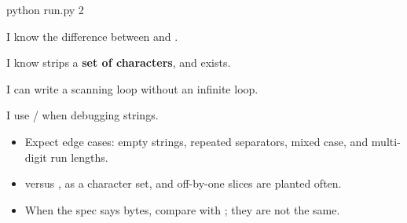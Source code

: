 \documentclass[10pt,a4paper]{article}
\begin{document}
\begin{shcode}
python run.py 2
\end{shcode}
\begin{checklistbox}
\begin{checklist}
\item I know the difference between  and .
\item I know  strips a \textbf{set of characters}, and  exists.
\item I can write a  scanning loop without an infinite loop.
\item I use  /  when debugging strings.
\end{checklist}
\scoreline
\end{checklistbox}
\begin{examlensbox}
\begin{itemize}
\item Expect edge cases: empty strings, repeated separators, mixed case, and multi-digit run lengths.
\item {} versus ,  as a character set, and off-by-one slices are planted often.
\item When the spec says bytes, compare  with ; they are not the same.
\end{itemize}
\end{examlensbox}
\bugjournalifspace
\end{document}
